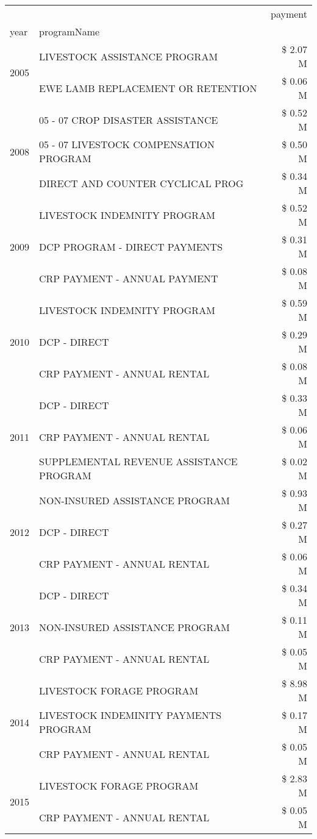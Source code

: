 \begin{tabular}{llr}
\toprule
 &  & payment \\
year & programName &  \\
\midrule
\multirow[t]{2}{*}{2005} & LIVESTOCK ASSISTANCE PROGRAM & \$ 2.07 M \\
 & EWE LAMB REPLACEMENT OR RETENTION & \$ 0.06 M \\
\cline{1-3}
\multirow[t]{3}{*}{2008} & 05 - 07 CROP DISASTER ASSISTANCE & \$ 0.52 M \\
 & 05 - 07 LIVESTOCK COMPENSATION PROGRAM & \$ 0.50 M \\
 & DIRECT AND COUNTER CYCLICAL PROG & \$ 0.34 M \\
\cline{1-3}
\multirow[t]{3}{*}{2009} & LIVESTOCK INDEMNITY PROGRAM & \$ 0.52 M \\
 & DCP PROGRAM - DIRECT PAYMENTS & \$ 0.31 M \\
 & CRP PAYMENT - ANNUAL PAYMENT & \$ 0.08 M \\
\cline{1-3}
\multirow[t]{3}{*}{2010} & LIVESTOCK INDEMNITY PROGRAM & \$ 0.59 M \\
 & DCP - DIRECT & \$ 0.29 M \\
 & CRP PAYMENT - ANNUAL RENTAL & \$ 0.08 M \\
\cline{1-3}
\multirow[t]{3}{*}{2011} & DCP - DIRECT & \$ 0.33 M \\
 & CRP PAYMENT - ANNUAL RENTAL & \$ 0.06 M \\
 & SUPPLEMENTAL REVENUE ASSISTANCE PROGRAM & \$ 0.02 M \\
\cline{1-3}
\multirow[t]{3}{*}{2012} & NON-INSURED ASSISTANCE PROGRAM & \$ 0.93 M \\
 & DCP - DIRECT & \$ 0.27 M \\
 & CRP PAYMENT - ANNUAL RENTAL & \$ 0.06 M \\
\cline{1-3}
\multirow[t]{3}{*}{2013} & DCP - DIRECT & \$ 0.34 M \\
 & NON-INSURED ASSISTANCE PROGRAM & \$ 0.11 M \\
 & CRP PAYMENT - ANNUAL RENTAL & \$ 0.05 M \\
\cline{1-3}
\multirow[t]{3}{*}{2014} & LIVESTOCK FORAGE PROGRAM & \$ 8.98 M \\
 & LIVESTOCK INDEMINITY PAYMENTS PROGRAM & \$ 0.17 M \\
 & CRP PAYMENT - ANNUAL RENTAL & \$ 0.05 M \\
\cline{1-3}
\multirow[t]{3}{*}{2015} & LIVESTOCK FORAGE PROGRAM & \$ 2.83 M \\
 & CRP PAYMENT - ANNUAL RENTAL & \$ 0.05 M \\

\end{tabular}
